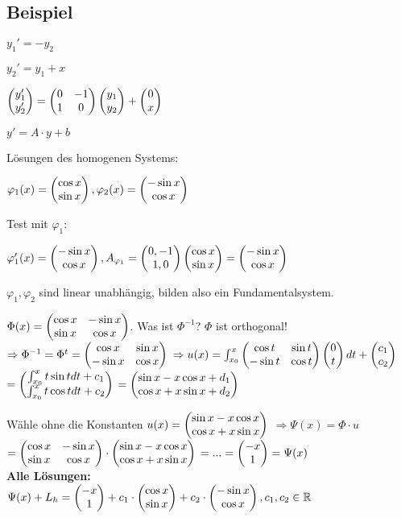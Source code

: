 \renewcommand{\ldate}{2015-12-17}

\subsection{Beispiel}
$y_1' = -y_2$

$y_2' = y_1 + x$

$ \begin{pmatrix} y_1'\\y_2' \end{pmatrix}  =  \begin{pmatrix} 0 &  -1\\1 & 0 \end{pmatrix}   \begin{pmatrix} y_1\\y_2 \end{pmatrix}  +  \begin{pmatrix} 0\\x \end{pmatrix} $

$y' = A\cdot y + b$

Lösungen des homogenen Systems: 

$ \varphi_1(x) =  \begin{pmatrix} \cos x \\ \sin x \end{pmatrix} , \varphi_2(x)= \begin{pmatrix} -\sin x\\\cos x \end{pmatrix} $

Test mit $\varphi_1$:

$\varphi_1'(x) =  \begin{pmatrix} -\sin x\\\cos x \end{pmatrix} , A_{\varphi_1} =  \begin{pmatrix} 0,-1\\1,0 \end{pmatrix}   \begin{pmatrix} \cos x\\\sin x \end{pmatrix}  =  \begin{pmatrix} -\sin x\\\cos x \end{pmatrix} $

$\varphi_1, \varphi_2$ sind linear unabhängig, bilden also ein Fundamentalsystem.

$\Phi(x) =  \begin{pmatrix} \cos x &  -\sin x\\\sin x &  \cos x \end{pmatrix} $. Was ist $\Phi^{-1}$? $\Phi$ ist orthogonal! 
$\Rightarrow \Phi^{-1} = \Phi^t =  \begin{pmatrix} \cos x &  \sin x\\-\sin x &  \cos x \end{pmatrix} $
$\Rightarrow u(x) = \int_{x_0}^{x}  \begin{pmatrix} \cos t & \sin t\\-\sin t &  \cos t \end{pmatrix}   \begin{pmatrix} 0\\t \end{pmatrix}  dt +  \begin{pmatrix} c_1\\c_2 \end{pmatrix} $
$= \begin{pmatrix} \int_{x_0}^{x} t \sin t dt + c_1\\\int_{x_0}^{x} t \cos t dt + c_2 \end{pmatrix} $
$= \begin{pmatrix} \sin x - x \cos x + d_1\\\cos x + x \sin x + d_2 \end{pmatrix} $ 

Wähle ohne die Konstanten $u(x) =  \begin{pmatrix} \sin x - x \cos x\\\cos x + x \sin x \end{pmatrix} $
$\Rightarrow \Psi(x) = \Phi \cdot u$
$= \begin{pmatrix} \cos x & -\sin x\\\sin x & \cos x \end{pmatrix}  \cdot  \begin{pmatrix} \sin x - x \cos x\\\cos x + x \sin x \end{pmatrix} $
$=...= \begin{pmatrix} -x\\1 \end{pmatrix}  = \Psi(x)$\\

\textbf{Alle Lösungen:}\\
$\Psi(x) + L_h =  \begin{pmatrix} -x\\1 \end{pmatrix}  + c_1 \cdot  \begin{pmatrix} \cos x \\ \sin x \end{pmatrix}  + c_2 \cdot  \begin{pmatrix} -\sin x\\\cos x \end{pmatrix} , c_1,c_2 \in \mathbb{R}$
